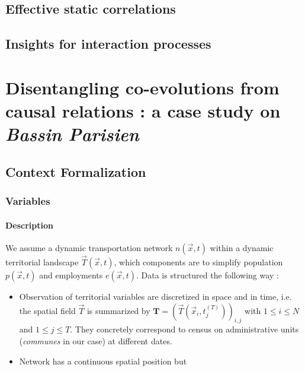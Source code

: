 \subsection{Effective static correlations}



\subsection{Insights for interaction processes}








\newpage

\section{Disentangling co-evolutions from causal relations : a case study on \emph{Bassin Parisien}}




\subsection{Context Formalization}

\subsubsection{Variables}

\paragraph{Description}

We assume a dynamic transportation network $n(\vec{x},t)$ within a dynamic territorial landscape $\vec{T}(\vec{x},t)$, which components are to simplify population $p(\vec{x},t)$ and employments $e(\vec{x},t)$. Data is structured the following way :
\begin{itemize}
\item Observation of territorial variables are discretized in space and in time, i.e. the spatial field $\vec{T}$ is summarized by $\mathbf{T} = \left(\vec{T}(\vec{x}_i,t_j^{(T)})\right)_{i,j}$ with $1\leq i \leq N$ and $1\leq j \leq T$. They concretely correspond to census on administrative units (\emph{communes} in our case) at different dates.
\item Network has a continuous spatial position but
\end{itemize}




